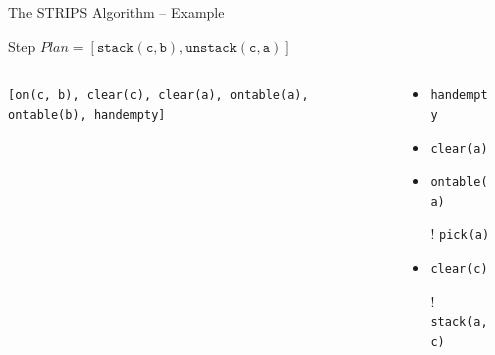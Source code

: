 \documentclass[presentation]{beamer}\mode<presentation>{\usetheme{AMSBolognaFC}}
\begin{document}
\begin{frame}[c]{The STRIPS Algorithm -- Example}
\small

\begin{exampleblock}{Step \nextStripsExampleStep{} \hfill $Plan = [\mathtt{stack(c,b),unstack(c,a)}]$}
    \begin{columns}[t]
        \begin{column}{.30\linewidth}\centering
            \texttt{[on(c, b), clear(c), clear(a), ontable(a), ontable(b), \alert{handempty}]}
        \end{column}
        \begin{column}{.50\linewidth}\centering
            \begin{itemize}
                \item \alert{\texttt{handempty}}
                \item \texttt{clear(a)}
                \item \texttt{ontable(a)}
                \item[!] \texttt{pick(a)}
                \item \texttt{clear(c)}
                \item[!] \texttt{stack(a,c)}
            \end{itemize}
        \end{column}
        \begin{column}{.10\linewidth}\centering
            
        \end{column}
    \end{columns}
\end{exampleblock}

\end{frame}
\end{document}
